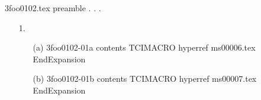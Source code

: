 3foo0102.tex preamble
.
.
.
\begin{enumerate}
\item[ 1.]
\begin{enumerate}
3foo0102-01 contents
\item[(a)]
3foo0102-01a contents
TCIMACRO
hyperref ms00006.tex
EndExpansion
\item[(b)]
3foo0102-01b contents
TCIMACRO
hyperref ms00007.tex
EndExpansion
\end{enumerate}
\end{enumerate}
